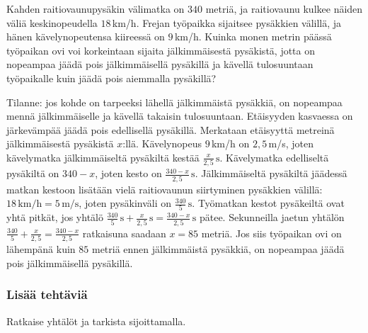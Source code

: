 \begin{tehtavasivu}
\begin{tehtava}
Kahden raitiovaunupysäkin välimatka on $340$ metriä, ja raitiovaunu kulkee näiden väliä keskinopeudella $18$\,km/h. Frejan työpaikka sijaitsee pysäkkien välillä, ja hänen kävelynopeutensa kiireessä on $9$\,km/h. Kuinka monen metrin päässä työpaikan ovi voi korkeintaan sijaita jälkimmäisestä pysäkistä, jotta on nopeampaa jäädä pois jälkimmäisellä pysäkillä ja kävellä tulosuuntaan työpaikalle kuin jäädä pois aiemmalla pysäkillä?
	\begin{vastaus}
	Tilanne: jos kohde on tarpeeksi lähellä jälkimmäistä pysäkkiä, on nopeampaa mennä jälkimmäiselle ja kävellä takaisin tulosuuntaan. Etäisyyden kasvaessa on järkevämpää jäädä pois edellisellä pysäkillä. Merkataan etäisyyttä metreinä jälkimmäisestä pysäkistä $x$:llä. Kävelynopeus $9$\,km/h on $2,5$\,m/s, joten kävelymatka jälkimmäiseltä pysäkiltä kestää $\frac{x}{2,5}\,\textrm{s}$. Kävelymatka edelliseltä pysäkiltä on $340-x$, joten kesto on $\frac{340-x}{2,5}\,\textrm{s}$. Jälkimmäiseltä pysäkiltä jäädessä matkan kestoon lisätään vielä raitiovaunun siirtyminen pysäkkien välillä: $18\,\textrm{km/h}=5\,\textrm{m/s}$, joten pysäkinväli on $\frac{340}{5}\,\textrm{s}$. Työmatkan kestot pysäkeiltä ovat yhtä pitkät, jos yhtälö $\frac{340}{5}\,\textrm{s}+\frac{x}{2,5}\,\textrm{s}=\frac{340-x}{2,5}\,\textrm{s}$ pätee. Sekunneilla jaetun yhtälön $\frac{340}{5}+\frac{x}{2,5}=\frac{340-x}{2,5}$ ratkaisuna saadaan $x=85$ metriä. Jos siis työpaikan ovi on lähempänä kuin $85$ metriä ennen jälkimmäistä pysäkkiä, on nopeampaa jäädä pois jälkimmäisellä pysäkillä.
	\end{vastaus} 
\end{tehtava}

\subsubsection*{Lisää tehtäviä}

\begin{tehtava}
Ratkaise yhtälöt ja tarkista sijoittamalla.
	\begin{vastaus}
	\end{vastaus}
\end{tehtava}


\end{tehtavasivu}
